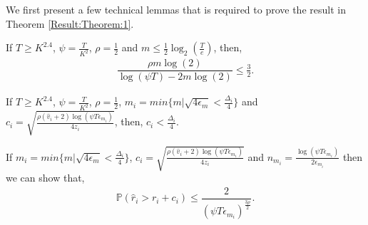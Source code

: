 We first present a few technical lemmas that is required  to prove the result in Theorem \ref{Result:Theorem:1}.

\begin{lemma}
\label{proofTheorem:Lemma:1}
If $T\geq K^{2.4}$, $\psi=\frac{T}{ K^2}$, $\rho=\frac{1}{2}$ and $m\leq \frac{1}{2} \log_2\left(\frac{T}{e}\right) $, then,
\begin{align*}
\dfrac{\rho m \log(2)}{\log(\psi T) - 2m\log( 2)} \leq \frac{3}{2}.
\end{align*}
\end{lemma}



\begin{lemma}
\label{proofTheorem:Lemma:2}
If $T\geq K^{2.4}$, $\psi=\frac{T}{ K^2}$, $\rho =\frac{1}{2}$, $m_i = min\lbrace m|\sqrt{4\epsilon_{m} } < \frac{\Delta_i}{4} \rbrace $ and $c_{i} =\sqrt{\frac{\rho (\hat{v}_i + 2)\log (\psi T\epsilon_{m_{i}})}{4 z_i}}$, then,
$c_{i} < \frac{\Delta_i}{4}$.
\end{lemma}



\begin{lemma}
\label{proofTheorem:Lemma:3}
If $m_i = min\lbrace m|\sqrt{4\epsilon_{m} } < \frac{\Delta_i}{4} \rbrace $,  $c_{i} = \sqrt{\frac{\rho (\hat{v}_i + 2) \log (\psi T\epsilon_{m_{i}})}{4 z_{i}}}$ and $n_{m_i} = \frac{\log{(\psi T\epsilon_{m_{i}})}}{2\epsilon_{m_{i}}}$ then we can show that,
\begin{align*}
\mathbb{P}(\hat{r}_{i}> r_{i} + c_{i})\le \dfrac{2}{(\psi  T\epsilon_{m_{i}})^{\frac{3\rho}{2}}}.
\end{align*}
\end{lemma}






